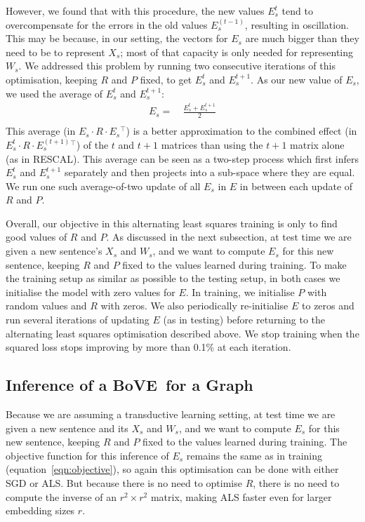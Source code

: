 \documentclass[11pt,a4paper]{article}
\newcommand{\trans}{{}^{\top}}
\newcommand{\by}{{\times}}
\newcommand{\bove}{Bo{\nolinebreak\hspace{-0.25ex}}VE}
\begin{document}
However, we found that with this procedure, the new values $E^{t}_s$
tend to overcompensate for the errors in the old values $E^{(t-1)}_s$,
resulting in oscillation.  This may be because, in our setting, the vectors
for $E_s$ are much bigger than they need to be to represent $X_s$; most of
that capacity is only needed for representing $W_s$.  We addressed this
problem by running two consecutive iterations of this optimisation, keeping
$R$ and $P$ fixed, to get $E^{t}_s$ and $E^{t+1}_s$.  As our new value of
$E_s$, we used the average of $E^{t}_s$ and $E^{t+1}_s$:
\vspace{-0.5ex}
\begin{align}
E_s =~& \frac{E^{t}_s + E^{t+1}_s}{2}
\label{eqn:aveE}
\\[-4ex]\nonumber
\end{align}
This average (in $E_s \cdot R \cdot E_s\!\trans$) is a better approximation to
the combined effect (in $E^{t}_s \cdot R \cdot E^{(t+1)}_s\!\trans$) of the
$t$ and $t+1$ matrices than using the $t+1$ matrix alone (as in RESCAL).
This average can be seen as a two-step process which first infers $E^{t}_s$
and $E^{t+1}_s$ separately and then projects into a sub-space where they are
equal.  We run one such average-of-two update of all $E_s$ in $E$ in between
each update of $R$ and $P$.


Overall, our objective in this alternating least squares training is only to
find good values of $R$ and $P$.  As discussed in the next subsection, at test
time we are given a new sentence's $X_s$ and $W_s$, and we want to compute
$E_s$ for this new sentence, keeping $R$ and $P$ fixed to the values learned
during training.  To make the training setup as similar as possible to the
testing setup, in both cases we initialise the model with zero values for $E$.
In training, we initialise $P$ with random values and $R$ with zeros.  We also
periodically re-initialise $E$ to zeros and run several iterations of updating
$E$ (as in testing) before returning to the alternating least squares
optimisation described above.  We stop training when the squared loss stops
improving by more than 0.1\% at each iteration.


\subsection{Inference of a \bove\ for a Graph}
\label{sec:inference}

Because we are assuming a transductive learning setting, at test time we are
given a new sentence and its $X_s$ and $W_s$, and we want to compute $E_s$ for
this new sentence, keeping $R$ and $P$ fixed to the values learned during
training.  The objective function for this inference of $E_s$ remains the same
as in training (equation~\ref{eqn:objective}), so again this optimisation can
be done with either SGD or ALS.  But because there is no need to optimise $R$,
there is no need to compute the inverse of an $r^2\by r^2$ matrix, making ALS
faster even for larger embedding sizes $r$.
\end{document}
